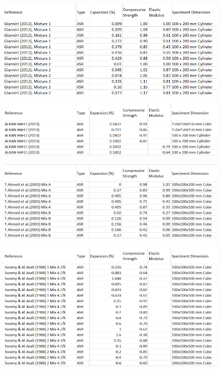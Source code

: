 \begin{figure}[h!]
  \centering
  \includegraphics[width=1.0\linewidth]{Reference/GIANNINIASRdata.png}
\end{figure}

\begin{figure}[h!]
  \centering
  \includegraphics[width=1.0\linewidth]{Reference/ALKANASRdata.png}
\end{figure}

\begin{figure}[h!]
  \centering
  \includegraphics[width=1.0\linewidth]{Reference/AhmedASRdata.png}
\end{figure}

\begin{figure}[h!]
  \centering
  \includegraphics[width=1.0\linewidth]{Reference/SwamyASRdata_1.png}
\end{figure}

